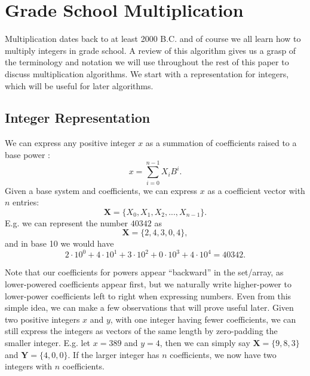 \documentclass[psamsfonts,reqno]{amsart}
\theoremstyle{definition}
\theoremstyle{remark}
\numberwithin{equation}{section}
\begin{document}
\section{Grade School Multiplication}
Multiplication dates back to at least 2000 B.C. \cite{burton1985history} and of course we all learn how to multiply integers in grade school. A review of this algorithm gives us a grasp of the terminology and notation we will use throughout the rest of this paper to discuss multiplication algorithms. We start with a representation for integers, which will be useful for later algorithms.

\subsection{Integer Representation \nopunct}

We can express any positive integer $x$ as a summation of coefficients raised to a base power \cite{silverman2014friendly}:
\begin{equation*}
	x = \sum_{i=0}^{n-1} X_iB^i.
\end{equation*}
Given a base system and coefficients, we can express $x$ as a coefficient vector with $n$ entries: 
\begin{equation*}
	\mathbf{X}=\{X_0, X_1, X_2, ..., X_{n-1}\}.
\end{equation*}
E.g. we can represent the number $40342$ as 
\begin{equation*}
	\mathbf{X}=\{2, 4, 3, 0, 4\},
\end{equation*}
and in base 10 we would have 
\begin{equation*}
	2 \cdot 10^0 + 4 \cdot 10^1 + 3 \cdot 10^2 + 0 \cdot 10^3 + 4 \cdot 10^4 =40342.
\end{equation*}

Note that our coefficients for powers appear ``backward'' in the set/array, as lower-powered coefficients appear first, but we naturally write higher-power to lower-power coefficients left to right when expressing numbers. Even from this simple idea, we can make a few observations that will prove useful later. Given two positive integers $x$ and $y$, with one integer having fewer coefficients, we can still express the integers as vectors of the same length by zero-padding the smaller integer. E.g. let $x=389$ and $y=4$, then we can simply say $\mathbf{X}=\{9, 8, 3\}$ and $\mathbf{Y}=\{4, 0, 0\}$. If the larger integer has $n$ coefficients, we now have two integers with $n$ coefficients.
\end{document}

